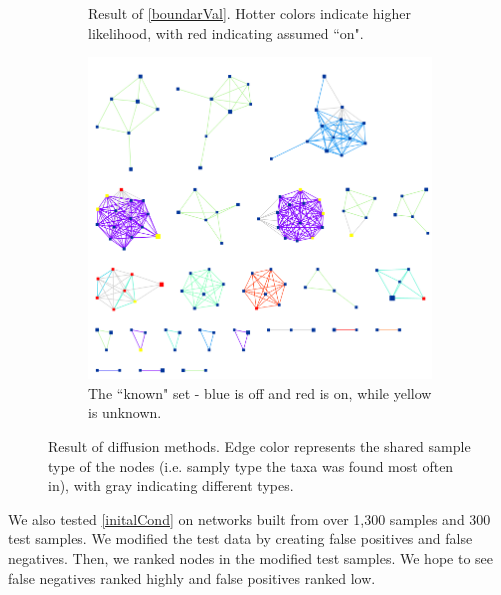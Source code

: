 \documentclass[10pt]{article}
\theoremstyle{definition}
\numberwithin{theorem}{section}
\numberwithin{definition}{section}
\numberwithin{lemma}{section}
\numberwithin{corollary}{section}
\numberwithin{clm}{section}
\numberwithin{rmk}{section}
\begin{document}
\begin{figure}
\begin{center}
\begin{subfigure}[b]{0.48\linewidth}
\begin{center}
	\end{center}
	\caption{Result of \cref{boundarVal}. Hotter colors indicate higher likelihood, with red indicating assumed ``on".}
\end{subfigure}
\begin{subfigure}[b]{0.48\linewidth}
		\begin{center}
		\includegraphics[scale = 0.3]{ranked_known_nodes.png}	
	\end{center}
	\caption{The ``known" set - blue is off and red is on, while yellow is unknown.}
\end{subfigure}
\caption{Result of diffusion methods. Edge color represents the shared sample type of the nodes (i.e. samply type the taxa was found most often in), with gray indicating different types.}\label{diffusion_sample}
\end{center}
\end{figure}	

We also tested \cref{initalCond} on networks built from over 1,300 samples and 300 test samples. We modified the test data by creating false positives and false negatives. Then, we ranked nodes in the modified test samples. We hope to see false negatives ranked highly and false positives ranked low.
\end{document}
